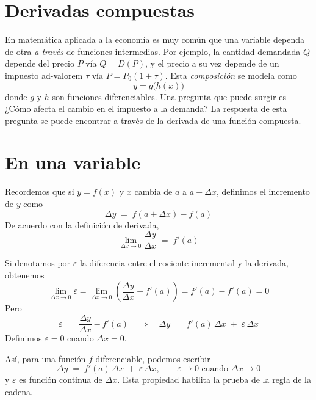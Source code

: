 \documentclass{article}
\begin{document}
\newpage

\section{Derivadas compuestas}





En matemática aplicada a la economía es muy común que una variable dependa de otra \emph{a través} de funciones intermedias. Por ejemplo, la cantidad demandada \(Q\) depende del precio \(P\) vía \(Q = D(P)\), y el precio a su vez depende de un impuesto ad-valorem \(\tau\) vía \(P = P_0(1+\tau)\). Esta \emph{composición} se modela como
\[
y = g\big(h(x)\big)
\]
donde \(g\) y \(h\) son funciones diferenciables. Una pregunta que puede surgir es ¿Cómo afecta el cambio en el impuesto a la demanda? La respuesta de esta pregunta se puede encontrar a través de la derivada de una función compuesta.

\section*{En una variable}

Recordemos que si \(y=f(x)\) y \(x\) cambia de \(a\) a \(a+\Delta x\), definimos el incremento de \(y\) como
\[
\Delta y \;=\; f(a+\Delta x)-f(a)
\]
De acuerdo con la definición de derivada,
\[
\lim_{\Delta x\to 0}\frac{\Delta y}{\Delta x} \;=\; f'(a)
\]

Si denotamos por \(\varepsilon\) la diferencia entre el cociente incremental y la derivada, obtenemos
\[
\lim_{\Delta x\to 0}\varepsilon
=\lim_{\Delta x\to 0}\!\left(\frac{\Delta y}{\Delta x}-f'(a)\right)
= f'(a)-f'(a)=0
\]
Pero
\[
\varepsilon \;=\; \frac{\Delta y}{\Delta x}-f'(a)
\quad\Longrightarrow\quad
\Delta y \;=\; f'(a)\,\Delta x \;+\; \varepsilon\,\Delta x
\]
Definimos \(\varepsilon=0\) cuando \(\Delta x=0\).

\medskip
\noindent
Así, para una función \(f\) diferenciable, podemos escribir
\begin{equation}
\Delta y \;=\; f'(a)\,\Delta x \;+\; \varepsilon\,\Delta x,
\qquad
\varepsilon\to 0 \text{ cuando } \Delta x\to 0
\tag{5}
\end{equation}
y \(\varepsilon\) es función continua de \(\Delta x\). Esta propiedad habilita la prueba de la regla de la cadena.
\end{document}
